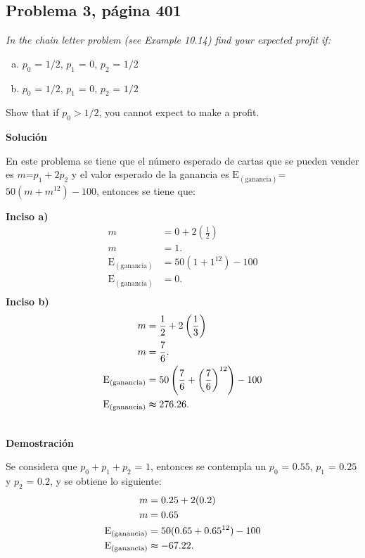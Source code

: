\documentclass{article}
\begin{document}
\subsection{Problema 3, página 401}
\noindent \textit{In the chain letter problem (see Example 10.14) find your expected profit if:}

\begin{enumerate}[a)]
    \item $p_{0}$ = $1/2$, $p_{1}$ = $0$, $p_{2}$ = $1/2$
    \item $p_{0}$ = $1/2$, $p_{1}$ = $0$, $p_{2}$ = $1/2$ 
\end{enumerate}
\noindent Show that if $p_{0} > 1/2$, you cannot expect to make a profit.

\noindent \textbf{Solución}

\noindent En este problema se tiene que el número esperado de cartas que se pueden vender es $m$=$p_{1}+2p_{2}$ y el valor esperado de la ganancia es $\text{E}_{(\text{ganancia})}$= $50(m+m^12)-100$, entonces se tiene que:

\noindent \textbf{Inciso a)}
    \begin{align}
    \nonumber
        m & = 0 + 2\left(\frac{1}{2}\right) \\ \nonumber
        m & = 1. \\ \nonumber
        \text{E}_{(\text{ganancia})} & = 50(1+1^{12})-100 \\ \nonumber
         \text{E}_{(\text{ganancia})} & = 0. \\ \nonumber
    \end{align}
\noindent \textbf{Inciso b)} 
    \begin{align}
    \nonumber
        m & = \frac{1}{2}+ 2\left(\frac{1}{3}\right)\\ \nonumber
        m & = \frac{7}{6}. \\ \nonumber
        \text{E}_{(\text{ganancia})} & = 50 \left(\frac{7}{6}+\left(\frac{7}{6} \right)^{12} \right)-100 \\ \nonumber
         \text{E}_{(\text{ganancia})} & \thickapprox 276.26. \\ \nonumber
    \end{align}  

\noindent \textbf{Demostración} 

\noindent Se considera que $p_{0} + p_{1} + p_{2}$ = $1$, entonces se contempla un $p_{0}$ = $0.55$, $p_{1}$ = $0.25$ y $p_{2}$ = $0.2$, y se obtiene lo siguiente:
\begin{align}
\nonumber
    m & = 0.25 + 2(0.2) \\ \nonumber
    m & = 0.65 \\ \nonumber
    \text{E}_{(\text{ganancia})} & = 50(0.65+0.65^{12})-100 \\ \nonumber
    \text{E}_{(\text{ganancia})} & \thickapprox -67.22. \\ \nonumber
\end{align}
\end{document}
